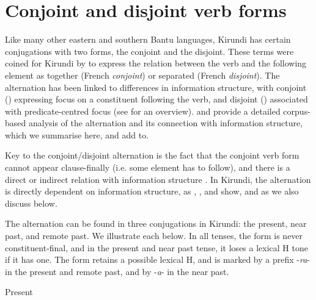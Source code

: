 \documentclass[output=paper]{langscibook}
\begin{document}
\section{Conjoint and disjoint verb forms}
\label{bkm:Ref81485420}
Like many other eastern and southern Bantu languages, Kirundi has certain conjugations with two forms, the conjoint and the disjoint. These terms were coined for Kirundi by \citet[215--216]{Meeussen1959} to express the relation between the verb and the following element as together (French \textit{conjoint}) or separated (French \textit{disjoint}). The alternation has been linked to differences in information structure, with conjoint (\CJ{}) expressing focus on a constituent following the verb, and disjoint (\DJ{}) associated with predicate-centred focus (see \citealt{vanderWalHyman2017} for an overview). \citet{Nshemezimana2016} and \citet{NshemezimanaBostoen2017} provide a detailed corpus-based analysis of the alternation and its connection with information structure, which we summarise here, and add to.

Key to the conjoint/disjoint alternation is the fact that the conjoint verb form cannot appear clause-finally (i.e. some element has to follow), and there is a direct or indirect relation with information structure \citep[15]{vanderWal2017}. In Kirundi, the alternation is directly dependent on information structure, as \citet{Ndayiragije1999}, \citet{Bukuru2003}, and \citet{NshemezimanaBostoen2017} show, and as we also discuss below.

The alternation can be found in three conjugations in Kirundi: the present, near past, and remote past. We illustrate each below. In all tenses, the \CJ{} form is never constituent-final, and in the present and near past tense, it loses a lexical H tone if it has one. The \DJ{} form retains a possible lexical H, and is marked by a prefix -\textit{ra}- in the present and remote past, and by -\textit{a}- in the near past.

\ea
Present \citep[79,~80,~and~derived]{Nshemezimana2016}
\ea
\begin{xlist}
\end{xlist}
\end{document}
